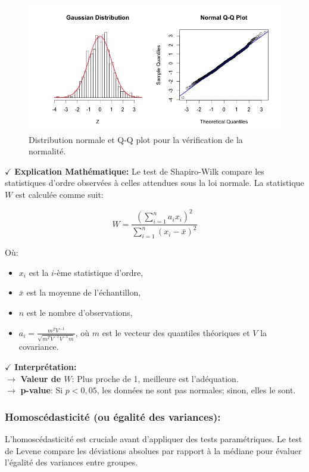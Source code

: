 \begin{figure}[H]
    \centering
    \includegraphics[width=0.7\linewidth]{gaussqq.png}
    \caption{Distribution normale et Q-Q plot pour la vérification de la normalité.}
    \label{fig:normality_check}
\end{figure}

\textbf{\(\checkmark\)} \textbf{Explication Mathématique:}
Le test de Shapiro-Wilk compare les statistiques d'ordre observées à celles attendues sous la loi normale. La statistique \( W \) est calculée comme suit:

\[
W = \frac{\left( \sum_{i=1}^{n} a_i x_i \right)^2}{\sum_{i=1}^{n} (x_i - \bar{x})^2}
\]

Où:
\begin{itemize}
    \item \( x_i \) est la \( i \)-ème statistique d'ordre,
    \item \( \bar{x} \) est la moyenne de l'échantillon,
    \item \( n \) est le nombre d'observations,
    \item \( a_i = \frac{m^T V^{-1}}{\sqrt{m^T V^{-1} V^{-1} m}} \), où \( m \) est le vecteur des quantiles théoriques et \( V \) la covariance.
\end{itemize}

\textbf{\(\checkmark\)} \textbf{Interprétation:}\\
\noindent \textbf{\(\rightarrow\)} \textbf{Valeur de \( W \)}: Plus proche de 1, meilleure est l'adéquation.\\
\textbf{\(\rightarrow\)} \textbf{p-value}: Si \( p < 0,05 \), les données ne sont pas normales; sinon, elles le sont.

\subsubsection*{Homoscédasticité (ou égalité des variances):}

L'homoscédasticité est cruciale avant d'appliquer des tests paramétriques. Le test de Levene compare les déviations absolues par rapport à la médiane pour évaluer l'égalité des variances entre groupes.

